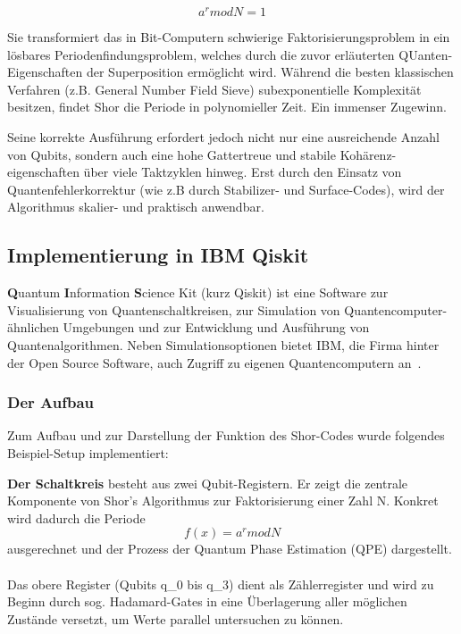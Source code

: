 \begin{equation}
    a^r mod N = 1
\end{equation}

Sie transformiert das in Bit-Computern schwierige Faktorisierungsproblem in ein lösbares Periodenfindungsproblem, welches durch die zuvor erläuterten QUanten-Eigenschaften der Superposition ermöglicht wird.
Während die besten klassischen Verfahren (z.B. General Number Field Sieve) subexponentielle Komplexität besitzen, findet Shor die Periode in polynomieller Zeit. Ein immenser Zugewinn.

Seine korrekte Ausführung erfordert jedoch nicht nur eine ausreichende Anzahl von Qubits, sondern auch eine hohe Gattertreue und stabile Kohärenz-eigenschaften über viele Taktzyklen hinweg. Erst durch den Einsatz von Quantenfehlerkorrektur (wie z.B durch Stabilizer- und Surface-Codes), wird der Algorithmus skalier- und praktisch anwendbar.

\subsection{Implementierung in IBM Qiskit}
\textbf{Q}uantum \textbf{I}nformation \textbf{S}cience Kit (kurz Qiskit) ist eine Software zur Visualisierung von Quantenschaltkreisen, zur Simulation von Quantencomputer-ähnlichen Umgebungen und zur Entwicklung und Ausführung von Quantenalgorithmen. Neben Simulationsoptionen bietet IBM, die Firma hinter der Open Source Software, auch Zugriff zu eigenen Quantencomputern an~\cite{qiskit}.


\subsubsection{Der Aufbau}
Zum Aufbau und zur Darstellung der Funktion des Shor-Codes wurde folgendes Beispiel-Setup implementiert:

\textbf{Der Schaltkreis} besteht aus zwei Qubit-Registern. Er zeigt die zentrale Komponente von Shor's Algorithmus zur Faktorisierung einer Zahl N. Konkret wird dadurch die Periode 
\begin{equation}
    f(x) = a^r mod N
\end{equation}
ausgerechnet und der Prozess der
Quantum Phase Estimation (QPE) dargestellt.
\\
\\
 Das obere Register (Qubits q\_0 bis q\_3) dient als Zählerregister und wird zu Beginn durch sog. Hadamard-Gates in eine Überlagerung aller möglichen Zustände versetzt, um Werte parallel untersuchen zu können.

